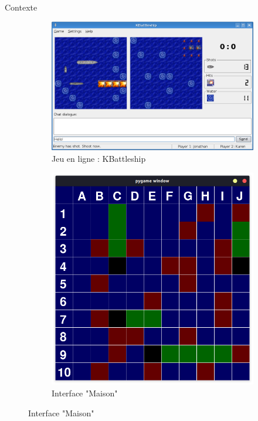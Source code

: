 	\begin{frame}{Contexte}
	    \begin{figure}
		    \begin{subfigure}{.50\textwidth}
    		    \centering
                \includegraphics[width=.9\linewidth]{images/kbattleship.png}
                \caption*{Jeu en ligne : KBattleship}
                \label{fig:kbattleship}
            \end{subfigure}
            \begin{subfigure}{.48\textwidth}
                \centering
                \includegraphics[width=.9\linewidth]{images/interface.png}
                 \caption*{Interface "Maison"}
                \label{fig:interfacemaison}
            \end{subfigure}
        \end{figure}
	\end{frame}
	
